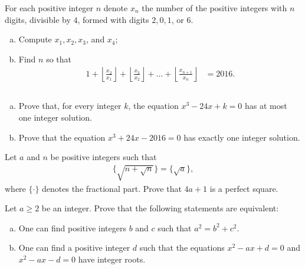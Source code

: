 \documentclass[problems.tex]{subfile}
\begin{document}
	\begin{problem}
		For each positive integer $n$ denote $x_n$ the number of the positive
		integers with $n$ digits, divisible by $4$, formed with digits $2, 0, 1$, or $6$.
		\begin{enumerate}[(a)]
			\item Compute $x_1, x_2, x_3$, and $x_4$;
			\item Find $n$ so that
			\begin{align*}
				1 + \left\lfloor \frac{x_2}{x_1}\right\rfloor + \left\lfloor \frac{x_3}{x_2}\right\rfloor + \dots + \left\lfloor \frac{x_{n+1}}{x_n}\right\rfloor &= 2016.
			\end{align*}
		\end{enumerate}
	\end{problem}




	\begin{problem}
		$ $
		\begin{enumerate}[(a)]
			\item Prove that, for every integer $k$, the equation $x^3 - 24x + k = 0$ has at most one integer solution.
			\item Prove that the equation $x^3 + 24x - 2016 = 0$ has exactly one integer solution.
		\end{enumerate}
	\end{problem}



	\begin{problem}
		Let $a$ and $n$ be positive integers such that
		\begin{align*}
			\Bigg\{ \sqrt{n + \sqrt{n}}\Bigg\} = \big\{\sqrt a\big\},
		\end{align*}
		where $\{ \cdot \}$ denotes the fractional part. Prove that $4a+1$ is a perfect square.
	\end{problem}



	\begin{problem}
		Let $a \geq 2$ be an integer. Prove that the following statements are equivalent:
		\begin{enumerate}[(a)]
			\item One can find positive integers $b$ and $c$ such that $a^2 = b^2 + c^2$.
			\item One can find a positive integer $d$ such that the equations $x^2 - ax + d = 0$ and $x^2 - ax - d = 0$ have integer roots.
		\end{enumerate}
	\end{problem}
\end{document}
